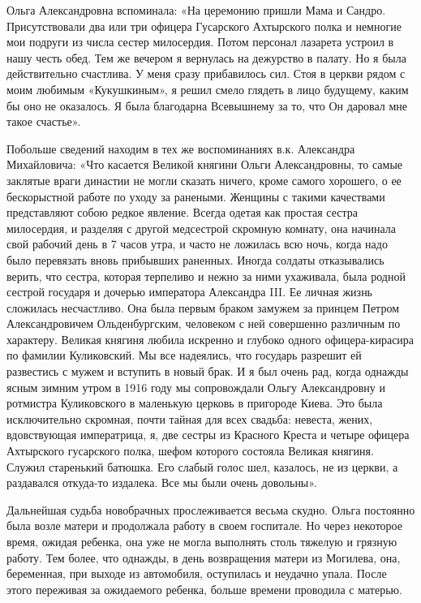 Ольга Александровна вспоминала: «На церемонию пришли Мама и Сандро.
Присутствовали два или три офицера Гусарского Ахтырского полка и немногие мои
подруги из числа сестер милосердия. Потом персонал лазарета устроил в нашу
честь обед. Тем же вечером я вернулась на дежурство в палату. Но я была
действительно счастлива. У меня сразу прибавилось сил. Стоя в церкви рядом с
моим любимым «Кукушкиным», я решил смело глядеть в лицо будущему, каким бы оно
не оказалось. Я была благодарна Всевышнему за то, что Он даровал мне такое
счастье». 

Побольше
сведений находим в тех же воспоминаниях в.к. Александра Михайловича: «Что
касается Великой княгини Ольги Александровны, то самые заклятые враги династии
не могли сказать ничего, кроме самого хорошего, о ее бескорыстной работе по
уходу за ранеными. Женщины с такими качествами представляют собою редкое
явление. Всегда одетая как простая сестра милосердия, и разделяя с другой
медсестрой скромную комнату, она начинала свой рабочий день в 7 часов утра, и
часто не ложилась всю ночь, когда надо было перевязать вновь прибывших
раненных. Иногда солдаты отказывались верить, что сестра, которая терпеливо и
нежно за ними ухаживала, была родной сестрой государя и дочерью императора
Александра III. Ее личная жизнь сложилась несчастливо. Она была первым браком
замужем за принцем Петром Александровичем Ольденбургским, человеком с ней
совершенно различным по характеру. Великая княгиня любила искренно и глубоко
одного офицера-кирасира по фамилии Куликовский. Мы все надеялись, что государь
разрешит ей развестись с мужем и вступить в новый брак. И я был очень рад,
когда однажды ясным зимним утром в 1916 году мы сопровождали Ольгу
Александровну и ротмистра Куликовского в маленькую церковь в пригороде Киева.
Это была исключительно скромная, почти тайная для всех свадьба: невеста, жених,
вдовствующая императрица, я, две сестры из Красного Креста и четыре офицера
Ахтырского гусарского полка, шефом которого состояла Великая княгиня. Служил
старенький батюшка. Его слабый голос шел, казалось, не из церкви, а раздавался
откуда-то издалека. Все мы были очень довольны».

Дальнейшая судьба новобрачных прослеживается весьма скудно. Ольга постоянно
была возле матери и продолжала работу в своем госпитале. Но через некоторое
время, ожидая ребенка, она уже не могла выполнять столь тяжелую и грязную
работу. Тем более, что однажды, в день возвращения матери из Могилева, она,
беременная, при выходе из автомобиля, оступилась и неудачно упала. После этого
переживая за ожидаемого ребенка, больше времени проводила с матерью.

